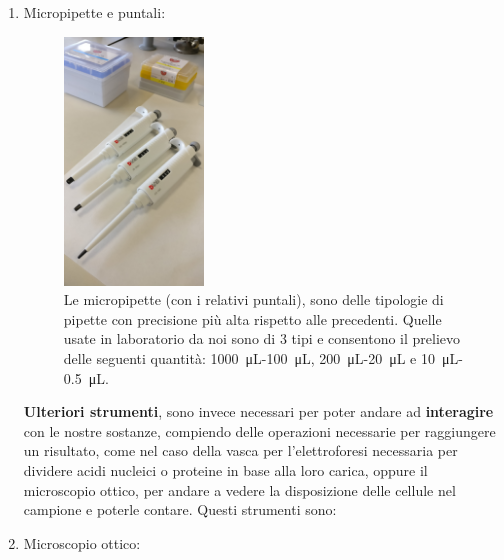 \documentclass{article}
\begin{document}
\begin{enumerate}
\begin{figure}[H]
		\end{figure}

		\vspace{0.5cm}


		\item Micropipette e puntali:

		\begin{figure}[H]

			\includegraphics[width=0.35\textwidth]{./immagini/micropipette.jpg}
			\caption{Le micropipette (con i relativi puntali),
			sono delle tipologie di pipette con precisione più alta rispetto alle precedenti.
			Quelle usate in laboratorio da noi sono di 3 tipi e consentono il prelievo delle seguenti quantit\`a:
			\SI{1000}{\micro\liter}-\SI{100}{\micro\liter}, \SI{200}{\micro\liter}-\SI{20}{\micro\liter} e
			\SI{10}{\micro\liter}-\SI{0.5}{\micro\liter}. }
			\label{micropipette}

		\end{figure}

		\vspace{0.5cm}

		\textbf{Ulteriori strumenti}, sono invece necessari per poter andare ad \textbf{interagire} con le nostre sostanze,
		compiendo delle operazioni necessarie per raggiungere un risultato,
		come nel caso della vasca per l'elettroforesi necessaria per dividere acidi nucleici o proteine
		in base alla loro carica, oppure il microscopio ottico, per andare a vedere la
		disposizione delle cellule nel campione e poterle contare.
Questi strumenti sono:




		\item Microscopio ottico:

		\begin{figure}[H]


\end{figure}
\end{enumerate}
\end{document}
